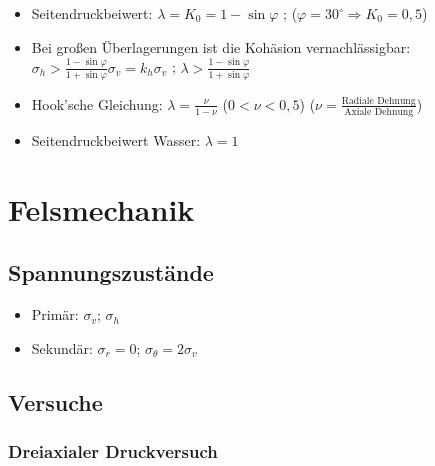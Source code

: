 \documentclass[fleqn,twoside]{article}
\begin{document}
\begin{itemize}
    \item Seitendruckbeiwert: $\lambda = K_0 = 1-\sin\varphi$ ; ($\varphi=30^\circ \Rightarrow K_0 = 0,5$)
    \item Bei großen Überlagerungen ist die Kohäsion vernachlässigbar: $\sigma_h > \frac{1-\sin\varphi}{1+\sin\varphi}\sigma_v = k_h \sigma_v$ ; $\lambda > \frac{1-\sin\varphi}{1+\sin\varphi}$
    \item Hook'sche Gleichung: $\lambda = \frac{\nu}{1-\nu}$ ($0<\nu<0,5$) ($\nu =\frac{\text{Radiale Dehnung}}{\text{Axiale Dehnung}}$)
    \item Seitendruckbeiwert Wasser: $\lambda=1$ 
\end{itemize}

\section{Felsmechanik}

\subsection{Spannungszustände}
\begin{itemize}
    \item Primär: $\sigma_v$; $\sigma_h$
    \item Sekundär: $\sigma_r=0$;  $\sigma_\theta=2\sigma_v$
\end{itemize}
\subsection{Versuche}

\subsubsection{Dreiaxialer Druckversuch}
\end{document}
